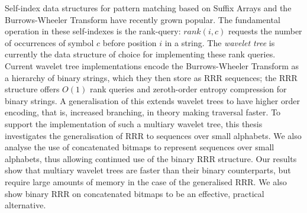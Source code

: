 Self-index data structures for pattern matching based on Suffix
Arrays and the Burrows-Wheeler Transform have recently grown
popular. The fundamental operation in these self-indexes is the rank-query: 
$rank(i, c)$ requests the number of occurrences of symbol $c$ before position 
$i$ in a string. The \emph{wavelet 
tree} is currently the data structure of choice for implementing these rank 
queries. Current wavelet tree implementations encode the Burrows-Wheeler 
Transform as a hierarchy of binary strings, which they then store as RRR sequences;
the RRR structure offers $O(1)$ rank queries and zeroth-order entropy compression for 
binary strings. A generalisation of this extends wavelet trees to have higher 
order encoding, that is, increased branching, in theory making traversal faster. 
To support the implementation of such a multiary
wavelet tree, this thesis investigates the generalisation of RRR to sequences 
over small alphabets. We also analyse the use of concatenated bitmaps to 
represent sequences over small alphabets, thus allowing continued use of the
binary RRR structure. Our results show that multiary wavelet trees are faster
than their binary counterparts, but require large amounts of memory in the 
case of the generalised RRR. We also show binary RRR on concatenated bitmaps to 
be an effective, practical alternative.